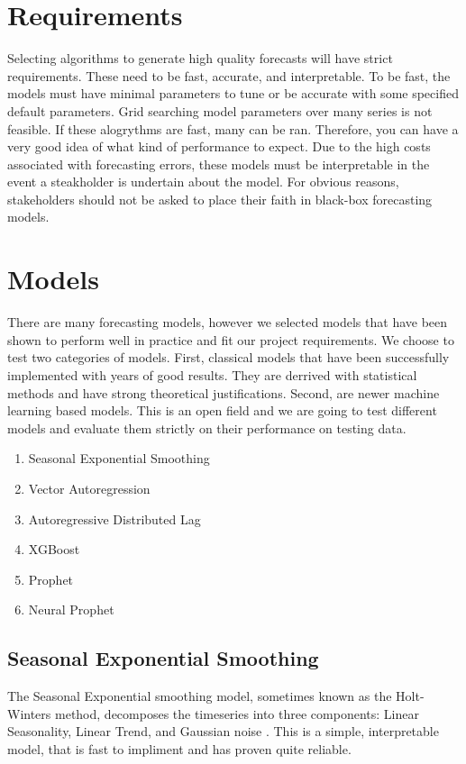 \documentclass[16pt,twocolumn,letterpaper]{article}
\begin{document}
\section{Requirements}

Selecting algorithms to generate high quality forecasts will have strict requirements. These need to be fast, accurate, and interpretable. To be fast, the models must have minimal parameters to tune or be accurate with some specified default parameters. Grid searching model parameters over many series is not feasible. If these alogrythms are fast, many can be ran. Therefore, you can have a very good idea of what kind of performance to expect. Due to the high costs associated with forecasting errors, these models must be interpretable in the event a steakholder is undertain about the model. For obvious reasons, stakeholders should not be asked to place their faith in black-box forecasting models.

\section{Models}

There are many forecasting models, however we selected models that have been shown to perform well in practice and fit our project requirements. We choose to test two categories of models. First, classical models that have been successfully implemented with years of good results. They are derrived with statistical methods and have strong theoretical justifications. Second, are newer machine learning based models. This is an open field and we are going to test different models and evaluate them strictly on their performance on testing data. 

\begin{enumerate}
\item Seasonal Exponential Smoothing
\item Vector Autoregression
\item Autoregressive Distributed Lag
\item XGBoost 
\item Prophet
\item Neural Prophet
\end{enumerate}

\subsection{Seasonal Exponential Smoothing}

The Seasonal Exponential smoothing model, sometimes known as the Holt-Winters method, decomposes the timeseries into three components: Linear Seasonality, Linear Trend, and Gaussian noise \cite{hyndman2018forecasting}. This is a simple, interpretable model, that is fast to impliment and has proven quite reliable.
\end{document}
